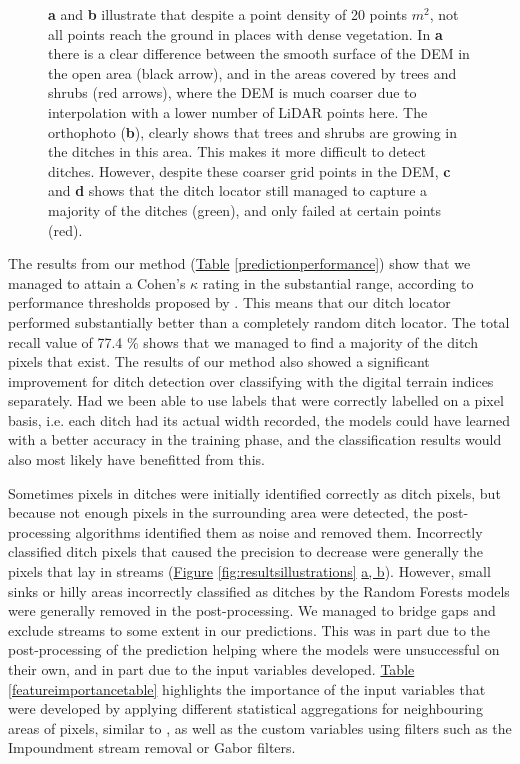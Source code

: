 \documentclass[]{interact}
\theoremstyle{plain}%
\theoremstyle{definition}
\theoremstyle{remark}
\begin{document}
\begin{figure} [!htb]
    \caption{\textbf{a} and \textbf{b} illustrate that despite a point density of 20 points $m^2$, not all points reach the ground in places with dense vegetation. In \textbf{a} there is a clear difference between the smooth surface of the DEM in the open area (black arrow), and in the areas covered by trees and shrubs (red arrows), where the DEM is much coarser due to interpolation with a lower number of LiDAR points here. The orthophoto (\textbf{b}), clearly shows that trees and shrubs are growing in the ditches in this area. This makes it more difficult to detect ditches. However, despite these coarser grid points in the DEM, \textbf{c} and \textbf{d} shows that the ditch locator still managed to capture a majority of the ditches (green), and only failed at certain points (red).}
    \label{fig:resultstreesbushes}
\end{figure}

The results from our method (\hyperref[predictionperformance]{Table} \ref{predictionperformance}) show that we managed to attain a Cohen's $\kappa$ rating in the substantial range, according to performance thresholds proposed by \citet{kappaanalysis}. This means that our ditch locator performed substantially better than a completely random ditch locator. The total recall value of 77.4 \% shows that we managed to find a majority of the ditch pixels that exist. The results of our method also showed a significant improvement for ditch detection over classifying with the digital terrain indices separately. Had we been able to use labels that were correctly labelled on a pixel basis, i.e. each ditch had its actual width recorded, the models could have learned with a better accuracy in the training phase, and the classification results would also most likely have benefitted from this.

Sometimes pixels in ditches were initially identified correctly as ditch pixels, but because not enough pixels in the surrounding area were detected, the post-processing algorithms identified them as noise and removed them. Incorrectly classified ditch pixels that caused the precision to decrease were generally the pixels that lay in streams (\hyperref[fig:resultsillustrations]{Figure} \ref{fig:resultsillustrations} \hyperref[fig:resultsillustrations]{a, b}). However, small sinks or hilly areas incorrectly classified as ditches by the Random Forests models were generally removed in the post-processing. We managed to bridge gaps and exclude streams to some extent in our predictions. This was in part due to the post-processing of the prediction helping where the models were unsuccessful on their own, and in part due to the input variables developed. \hyperref[featureimportancetable]{Table} \ref{featureimportancetable} highlights the importance of the input variables that were developed by applying different statistical aggregations for neighbouring areas of pixels, similar to \citet{roelens}, as well as the custom variables using filters such as the Impoundment stream removal or Gabor filters.
\end{document}
